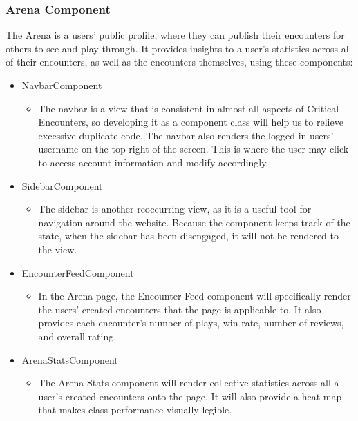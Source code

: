 \documentclass[12pt,a4paper]{report}
\begin{document}
		\subsubsection{Arena Component}
		The Arena is a users' public profile, where they can publish their encounters for others to see and play through. It provides insights to a user's statistics across all of their encounters, as well as the encounters themselves, using these components:
		\begin{itemize}
			\item NavbarComponent
			\begin{itemize}
				\item The navbar is a view that is consistent in almost all aspects of Critical Encounters, so developing it as a component class will help us to relieve excessive duplicate code. The navbar also renders the logged in users' username on the top right of the screen. This is where the user may click to access account information and modify accordingly.
			\end{itemize}
			\item SidebarComponent
			\begin{itemize}
				\item The sidebar is another reoccurring view, as it is a useful tool for navigation around the website. Because the component keeps track of the state, when the sidebar has been disengaged, it will not be rendered to the view. 
			\end{itemize}
			\item EncounterFeedComponent
			\begin{itemize}
				\item In the Arena page, the Encounter Feed component will specifically render the users' created encounters that the page is applicable to. It also provides each encounter's number of plays, win rate, number of reviews, and overall rating.
			\end{itemize}
			\item ArenaStatsComponent
			\begin{itemize}
				\item The Arena Stats component will render collective statistics across all a user's created encounters onto the page. It will also provide a heat map that makes class performance visually legible.	
			\end{itemize}
		\end{itemize}
		\newpage
\end{document}
